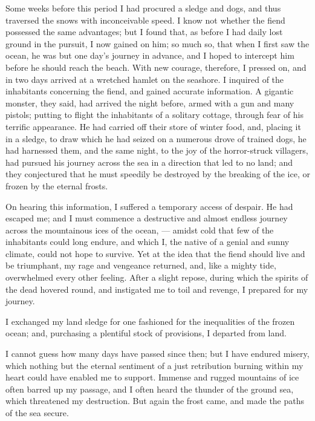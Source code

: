Some weeks before this period I
had procured a sledge and dogs, and
thus traversed the snows with inconceivable
speed. I know not whether
the fiend possessed the same advantages;
but I found that, as before I had
daily lost ground in the pursuit, I now
gained on him; so much so, that when
I first saw the ocean, he was but one
day's journey in advance, and I hoped
to intercept him before he should reach
the beach. With new courage, therefore,
I pressed on, and in two days arrived
at a wretched hamlet on the seashore.
I inquired of the inhabitants concerning
the fiend, and gained accurate
information. A gigantic monster, they
said, had arrived the night before, armed
with a gun and many pistols; putting
to flight the inhabitants of a solitary
cottage, through fear of his terrific appearance.
He had carried off their store
of winter food, and, placing it in a
sledge, to draw which he had seized
on a numerous drove of trained dogs,
he had harnessed them, and the same
night, to the joy of the horror-struck
villagers, had pursued his journey
across the sea in a direction that
led to no land; and they conjectured
that he must speedily be destroyed by
the breaking of the ice, or frozen by
the eternal frosts.

On hearing this information, I suffered
a temporary access of despair. He
had escaped me; and I must commence
a destructive and almost endless journey
across the mountainous ices of the
ocean, --- amidst cold that few of the inhabitants
could long endure, and which
I, the native of a genial and sunny climate,
could not hope to survive. Yet
at the idea that the fiend should live
and be triumphant, my rage and vengeance
returned, and, like a mighty
tide, overwhelmed every other feeling.
After a slight repose, during which the
spirits of the dead hovered round, and
instigated me to toil and revenge, I
prepared for my journey.

I exchanged my land sledge for one
fashioned for the inequalities of the
frozen ocean; and, purchasing a plentiful
stock of provisions, I departed
from land.

I cannot guess how many days have
passed since then; but I have endured
misery, which nothing but the eternal
sentiment of a just retribution burning
within my heart could have enabled
me to support. Immense and rugged
mountains of ice often barred up my
passage, and I often heard the thunder
of the ground sea, which threatened
my destruction. But again the
frost came, and made the paths of the
sea secure.

